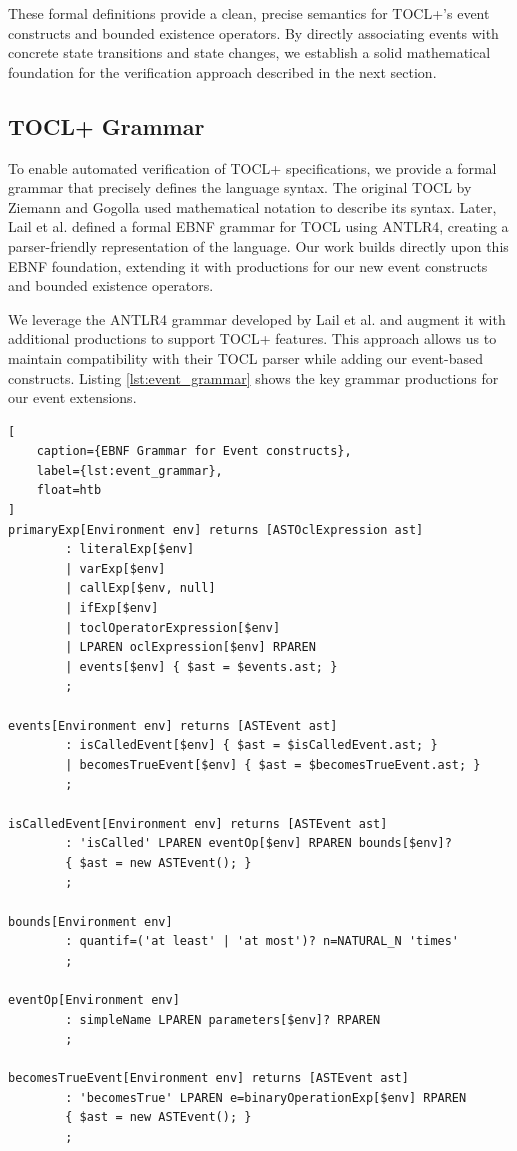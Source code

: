 These formal definitions provide a clean, precise semantics for TOCL+'s event 
constructs and bounded existence operators. By directly associating events with 
concrete state transitions and state changes, we establish a solid mathematical 
foundation for the verification approach described in the next section.



\subsection{TOCL+ Grammar}

\hspace{1cm} To enable automated verification of TOCL+ specifications, we provide a 
formal grammar that precisely defines the language syntax. The original TOCL by 
Ziemann and Gogolla used mathematical notation to describe its syntax. 
Later, Lail et al. \cite{TOCL2OCL} defined a formal EBNF grammar for TOCL using ANTLR4, 
creating a parser-friendly representation of the language. Our work builds directly 
upon this EBNF foundation, extending it with productions for our new event constructs 
and bounded existence operators.

We leverage the ANTLR4 grammar developed by Lail et al. and augment it with 
additional productions to support TOCL+ features. This approach allows us to 
maintain compatibility with their TOCL parser while adding our event-based 
constructs. Listing \ref{lst:event_grammar} shows the key grammar productions 
for our event extensions.

\begin{lstlisting}[
    caption={EBNF Grammar for Event constructs}, 
    label={lst:event_grammar},
    float=htb
]
primaryExp[Environment env] returns [ASTOclExpression ast]
        : literalExp[$env]
        | varExp[$env]
        | callExp[$env, null]
        | ifExp[$env]
        | toclOperatorExpression[$env]
        | LPAREN oclExpression[$env] RPAREN
        | events[$env] { $ast = $events.ast; }
        ;

events[Environment env] returns [ASTEvent ast]
        : isCalledEvent[$env] { $ast = $isCalledEvent.ast; }
        | becomesTrueEvent[$env] { $ast = $becomesTrueEvent.ast; }
        ;

isCalledEvent[Environment env] returns [ASTEvent ast]
        : 'isCalled' LPAREN eventOp[$env] RPAREN bounds[$env]?
        { $ast = new ASTEvent(); }
        ;

bounds[Environment env]
        : quantif=('at least' | 'at most')? n=NATURAL_N 'times'
        ;

eventOp[Environment env]
        : simpleName LPAREN parameters[$env]? RPAREN
        ;

becomesTrueEvent[Environment env] returns [ASTEvent ast]
        : 'becomesTrue' LPAREN e=binaryOperationExp[$env] RPAREN
        { $ast = new ASTEvent(); }
        ;
\end{lstlisting}

